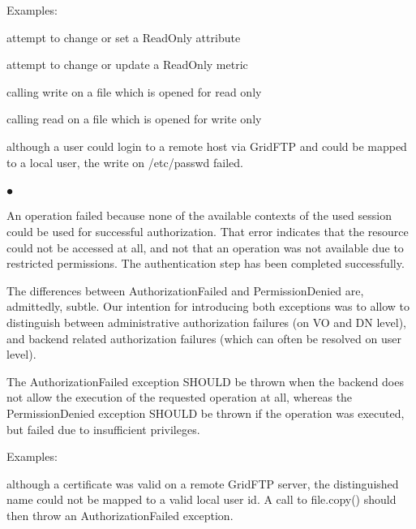     Examples:
 
    \begin{shortlist}
     \item attempt to change or set    a ReadOnly attribute
     \item attempt to change or update a ReadOnly metric
     \item calling write  on a file which is opened for read only
     \item calling read on a file which is opened for 
           write only
     \item although a user could login to a remote host via 
           GridFTP and could be mapped to a local user, the 
           write on /etc/passwd failed.
    \end{shortlist}
 
    
 
 
  \subsubsection*{$\bullet$ }\up
 
    An operation failed because none of the available contexts
    of the used session could be used for successful
    authorization. That error indicates that the
    resource could not be accessed at all, and not that an
    operation was not available due to restricted permissions.
    The authentication step has been completed successfully.
 
    The differences between AuthorizationFailed and
    PermissionDenied are, admittedly, subtle.  Our intention
    for introducing both exceptions was to allow to
    distinguish between administrative authorization failures
    (on VO and DN level), and backend related 
    authorization failures (which can often be resolved on 
    user level).
 
    The AuthorizationFailed exception SHOULD be thrown when
    the backend does not allow the execution of the 
    requested operation at all, whereas the PermissionDenied 
    exception SHOULD be thrown if the operation was executed, 
    but failed due to insufficient privileges.
 
    Examples:
 
    \begin{shortlist}
     \item although a certificate was valid on a remote GridFTP
       server, the distinguished name could not be mapped to a
       valid local user id.  A call to file.copy() should then
       throw an AuthorizationFailed exception.
    \end{shortlist}
 
